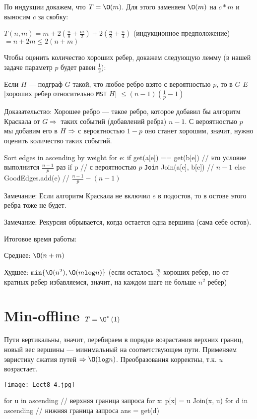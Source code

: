 	По индукции докажем,  что $T = \O(m)$. Для этого заменяем $\O(m)$ на $c * m$ и выносим $c$ за скобку:
 
	$T(n, m) = m + 2(\frac{n}{8} + \frac{m}{2}) + 2(\frac{n}{8} + \frac{n}{4}) $ (индукционное предположение) $ = n + 2m \le 2(n + m)$ 

	Чтобы оценить количество хороших ребер, докажем следующую лемму (в нашей задаче параметр $p$ будет равен  $\frac{1}{2}$): 

	Если $H$ — подграф $G$ такой, что любое ребро взято с вероятностью $p$, то в $G$ $E$[хороших ребер относительно \texttt{MST} $H$] $\le (n - 1)(\frac{1}{p} - 1)$ 

	Доказательство: Хорошее ребро — такое ребро, которое добавил бы алгоритм Краскала от $G \Rightarrow $ таких событий (добавлений ребра) $n - 1$. С вероятностью $p$ мы добавим его в $H \Rightarrow$ с вероятностью $1 - p$ оно станет хорошим, значит, нужно оценить количество таких событий. 

\begin{cppcode}
Sort edges in ascending by weight
for e:
	 if get(a[e]) == get(b[e]) // это условие выполнится $\frac{n - 1}{p}$ раз
		 if p // с вероятностью $p$ \texttt{Join}
			Join(a[e], b[e]) // $n - 1$
		else
			GoodEdges.add(e) // $\frac{n - 1}{p} - (n - 1)$
\end{cppcode}

	Замечание: Если алгоритм Краскала не включил $e$ в подостов, то в остове этого ребра тоже не будет. 

	Замечание: Рекурсия обрывается, когда остается одна вершина (сама себе остов). 

	Итоговое время работы: 

	Среднее: $\O(n + m)$ 

	Худшее: $\texttt{min}\{\O(n^2), \O(m\texttt{log}n)\}$ (если осталось $\frac{m}{2}$ хороших ребер, но от кратных ребер избавляемся, значит, на каждом шаге не больше $n^2$ ребер)

\section{Min-offline $T =  \O^*\left(1\right)$}
	Пути вертикальны, значит, перебираем в порядке возрастания верхних границ, новый вес вершины — минимальный на соответствующем пути. Применяем эвристику сжатия путей $\Ra \O(\texttt{log}n)$. Преобразования корректны, т.к. $u$ возрастает. 

\texttt{[image: Lect8\_4.jpg]}

\begin{cppcode}
for u in ascending // верхняя граница запроса
	for x: p[x] = u
		Join(x, u)
	for d in ascending // нижняя граница запроса
		ans = get(d)
\end{cppcode}


